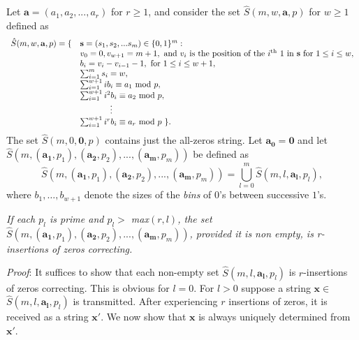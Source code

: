 Let $\mathbf{a}=\left(a_1,a_2,...,a_r\right)$ for $r \geq 1$, and
consider the set $\hat{S}(m,w,\mathbf{a},p)$ for $w \geq 1$ defined
as
\begin{equation}\label{exten}\begin{array}{lll}\hat{S}(m,w,\mathbf{a},p) = \{ & \mathbf{s}=(s_1, s_2, ... s_m) \in
\{0,1\}^m:\\
{} & v_0=0, v_{w+1}=m+1, \text{ and } v_i \text{ is the position of
the $i^{\text{th}}$ 1 in $\mathbf{s}$ for } 1 \leq i \leq w,\\{} &
b_i=v_i-v_{i-1}-1, \text{ for } 1 \leq i \leq w+1, \\
{} & \sum_{i=1}^m s_i = w,\\
{} & \sum_{i=1}^{w+1} ib_i \equiv a_1 \text{ mod } p,\\ {} &
\sum_{i=1}^{w+1} i^2b_i
\equiv a_2 \text{ mod } p,\\
{} & \hspace{0.5in}\vdots\\ {} & \sum_{i=1}^{w+1} i^rb_i \equiv a_r
\text{ mod } p~\}.\end{array}\end{equation} The set
$\hat{S}(m,0,\mathbf{0},p)$ contains just the all-zeros string. Let
$\mathbf{a_0} = \mathbf{0}$ and let
\newline \noindent $\hat{S}\left(m,(\mathbf{a_1},p_1),(\mathbf{a_2},p_2),...,(\mathbf{a_m},p_m)\right)$
be defined as
\begin{equation}\label{union}\hat{S}\left(m,(\mathbf{a_1},p_1),(\mathbf{a_2},p_2),...,(\mathbf{a_m},p_m)\right)=
\bigcup_{l=0}^{m} \hat{S}(m,l,\mathbf{a_l},p_l),\end{equation} where
$b_1, \ldots, b_{w+1}$ denote the sizes of the {\em bins} of $0$'s
between successive $1$'s.

\begin{lemma}\label{multproof}\textit{If each $p_l$ is prime and $p_l >$
max$(r,l)$, the set
$\hat{S}\left(m,(\mathbf{a_1},p_1),(\mathbf{a_2},p_2),...,(\mathbf{a_m},p_m)\right)$,
provided it is non empty, is r-insertions of zeros
correcting.}\end{lemma}



\textit{Proof}: It suffices to show that each non-empty set
$\hat{S}(m,l,\mathbf{a_l},p_l)$ is $r$-insertions of zeros
correcting. This is obvious for $l=0$. For $l>0$ suppose a string
$\mathbf{x} \in$ $\hat{S}(m,l,\mathbf{a_l},p_l)$ is transmitted.
After experiencing $r$ insertions of zeros, it is received as a
string $\mathbf{x'}$. We now show that $\mathbf{x}$ is always
uniquely determined from $\mathbf{x'}$.


